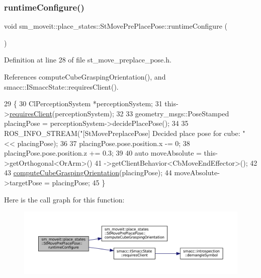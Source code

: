 \subsubsection{\texorpdfstring{runtime\+Configure()}{runtimeConfigure()}}
{\footnotesize\ttfamily void sm\+\_\+moveit\+::place\+\_\+states\+::\+St\+Move\+Pre\+Place\+Pose\+::runtime\+Configure (\begin{DoxyParamCaption}{ }\end{DoxyParamCaption})\hspace{0.3cm}{\ttfamily [inline]}}



Definition at line 28 of file st\+\_\+move\+\_\+preplace\+\_\+pose.\+h.



References compute\+Cube\+Grasping\+Orientation(), and smacc\+::\+I\+Smacc\+State\+::requires\+Client().


\begin{DoxyCode}
29     \{
30         ClPerceptionSystem *perceptionSystem;
31         this->\hyperlink{classsmacc_1_1ISmaccState_a7f95c9f0a6ea2d6f18d1aec0519de4ac}{requiresClient}(perceptionSystem);
32 
33         geometry\_msgs::PoseStamped placingPose = perceptionSystem->decidePlacePose();
34 
35         ROS\_INFO\_STREAM(\textcolor{stringliteral}{"[StMovePreplacePose] Decided place pose for cube: "} << placingPose);
36 
37         placingPose.pose.position.x -= 0;
38         placingPose.pose.position.z += 0.3;
39 
40         \textcolor{keyword}{auto} moveAbsolute = this->getOrthogonal<OrArm>()
41                                 ->getClientBehavior<CbMoveEndEffector>();
42 
43         \hyperlink{structsm__moveit_1_1place__states_1_1StMovePrePlacePose_add6f85ba0aa1e3905645881ecd0ba4e1}{computeCubeGraspingOrientation}(placingPose);
44         moveAbsolute->targetPose = placingPose;
45     \}
\end{DoxyCode}
Here is the call graph for this function\+:
\nopagebreak
\begin{figure}[H]
\begin{center}
\leavevmode
\includegraphics[width=350pt]{structsm__moveit_1_1place__states_1_1StMovePrePlacePose_afb210c2d0b44f2df7904a40f66f9ef0b_cgraph}
\end{center}
\end{figure}
\mbox{\label{structsm__moveit_1_1place__states_1_1StMovePrePlacePose_a3dc8d058fe81bb5fe5db216d9ee506ba}} 
